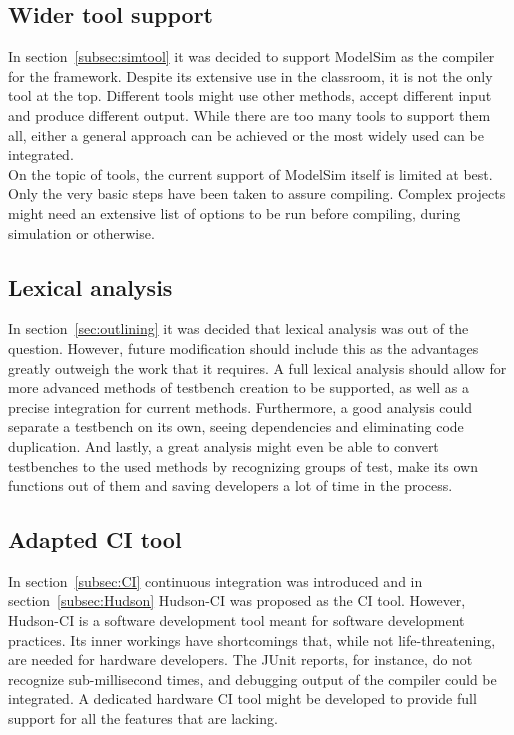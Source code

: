 \documentclass[11pt,british]{article}
\begin{document}
\subsection{Wider tool support}
In section~\ref{subsec:simtool} it was decided to support ModelSim as the compiler for the framework. Despite its extensive use in the classroom, it is not the only tool at the top. Different tools might use other methods, accept different input and produce different output. While there are too many tools to support them all, either a general approach can be achieved or the most widely used can be integrated.
\\[\baselineskip]
On the topic of tools, the current support of ModelSim itself is limited at best. Only the very basic steps have been taken to assure compiling. Complex projects might need an extensive list of options to be run before compiling, during simulation or otherwise.

\subsection{Lexical analysis}
In section~\ref{sec:outlining} it was decided that lexical analysis was out of the question. However, future modification should include this as the advantages greatly outweigh the work that it requires. A full lexical analysis should allow for more advanced methods of testbench creation to be supported, as well as a precise integration for current methods. Furthermore, a good analysis could separate a testbench on its own, seeing dependencies and eliminating code duplication. And lastly, a great analysis might even be able to convert testbenches to the used methods by recognizing groups of test, make its own functions out of them and saving developers a lot of time in the process.

\subsection{Adapted CI tool}
In section~\ref{subsec:CI} continuous integration was introduced and in section~\ref{subsec:Hudson} Hudson-CI was proposed as the \gls{CI} tool. However, Hudson-CI is a software development tool meant for software development practices. Its inner workings have shortcomings that, while not life-threatening, are needed for hardware developers. The JUnit reports, for instance, do not recognize sub-millisecond times, and debugging output of the compiler could be integrated. A dedicated hardware CI tool might be developed to provide full support for all the features that are lacking.
\end{document}
